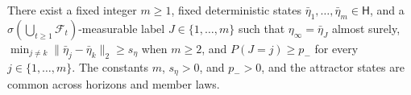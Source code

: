 There exist a fixed integer \(m\ge1\), fixed deterministic states \(\bar\eta_1,\ldots,\bar\eta_m\in\mathsf H\), and a \(\sigma(\bigcup_{t\ge1}\mathcal F_t)\)-measurable label \(J\in\{1,\ldots,m\}\) such that \(\eta_\infty=\bar\eta_J\) almost surely, \(\min_{j\ne k}\|\bar\eta_j-\bar\eta_k\|_2\ge s_\eta\) when \(m\ge2\), and \(P(J=j)\ge p_-\) for every \(j\in\{1,\ldots,m\}\). The constants \(m\), \(s_\eta>0\), and \(p_->0\), and the attractor states are common across horizons and member laws.